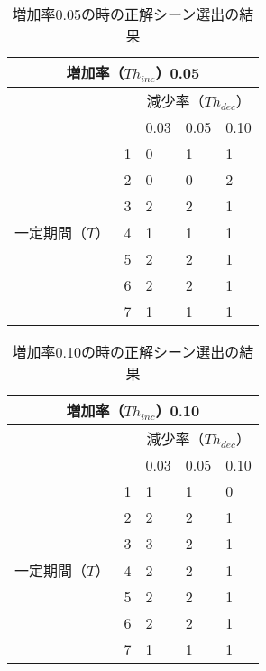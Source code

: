 \begin{table}[h]
  \caption{増加率0.05の時の正解シーン選出の結果}
  \label{tbl:digest1-1}
  \centering
      {\small
        \begin{tabular}{|l|l||l|l|l|} \hline
           \multicolumn{5}{|c|}{増加率（$Th_{inc}$）0.05} \\ \hline
           & & \multicolumn{3}{c|}{減少率（$Th_{dec}$）} \\ \hline
           & & 0.03 & 0.05 & 0.10 \\ \hline \hline \cline{2-5}
           & 1 & 0 & 1 & 1 \\ \cline{2-5}
           & 2 & 0 & 0 & 2 \\ \cline{2-5}
           & 3 & 2 & 2 & 1 \\ \cline{2-5}
           一定期間（$T$）& 4 & 1 & 1 & 1 \\ \cline{2-5}
           & 5 & 2 & 2 & 1 \\ \cline{2-5}
           & 6 & 2 & 2 & 1 \\ \cline{2-5}
           & 7 & 1 & 1 & 1 \\ \cline{2-5}
           \hline
        \end{tabular}
      }
\end{table}

\newpage

\begin{table}[h]
  \caption{増加率0.10の時の正解シーン選出の結果}
  \label{tbl:digest1-2}
  \centering
      {\small
        \begin{tabular}{|l|l||l|l|l|} \hline
           \multicolumn{5}{|c|}{増加率（$Th_{inc}$）0.10} \\ \hline
           & & \multicolumn{3}{c|}{減少率（$Th_{dec}$）} \\ \hline
           & & 0.03 & 0.05 & 0.10 \\ \hline \hline \cline{2-5}
           & 1 & 1 & 1 & 0 \\ \cline{2-5}
           & 2 & 2 & 2 & 1 \\ \cline{2-5}
           & 3 & 3 & 2 & 1 \\ \cline{2-5}
           一定期間（$T$）& 4 & 2 & 2 & 1 \\ \cline{2-5}
           & 5 & 2 & 2 & 1 \\ \cline{2-5}
           & 6 & 2 & 2 & 1 \\ \cline{2-5}
           & 7 & 1 & 1 & 1 \\ \cline{2-5}
           \hline
        \end{tabular}
      }
\end{table}

